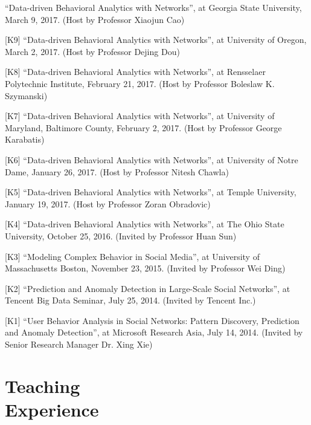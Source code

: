 \documentclass[margin, 9pt]{res}
\begin{document}
\begin{resume}
[K10] ``Data-driven Behavioral Analytics with Networks'', at Georgia State University, March 9, 2017. (Host by Professor Xiaojun Cao)

[K9] ``Data-driven Behavioral Analytics with Networks'', at University of Oregon, March 2, 2017. (Host by Professor Dejing Dou)

[K8] ``Data-driven Behavioral Analytics with Networks'', at Rensselaer Polytechnic Institute, February 21, 2017. (Host by Professor Boleslaw K. Szymanski)

[K7] ``Data-driven Behavioral Analytics with Networks'', at University of Maryland, Baltimore County, February 2, 2017. (Host by Professor George Karabatis)

[K6] ``Data-driven Behavioral Analytics with Networks'', at University of Notre Dame, January 26, 2017. (Host by Professor Nitesh Chawla)

[K5] ``Data-driven Behavioral Analytics with Networks'', at Temple University, January 19, 2017. (Host by Professor Zoran Obradovic)

[K4] ``Data-driven Behavioral Analytics with Networks'', at The Ohio State University, October 25, 2016. (Invited by Professor Huan Sun)

[K3] ``Modeling Complex Behavior in Social Media'', at University of Massachusetts Boston, November 23, 2015. (Invited by Professor Wei Ding)

[K2] ``Prediction and Anomaly Detection in Large-Scale Social Networks'', at Tencent Big Data Seminar, July 25, 2014. (Invited by Tencent Inc.)

[K1] ``User Behavior Analysis in Social Networks: Pattern Discovery, Prediction and Anomaly Detection'', at Microsoft Research Asia, July 14, 2014. (Invited by Senior Research Manager Dr. Xing Xie)


\section{Teaching \\ Experience}


\end{resume}
\end{document}
